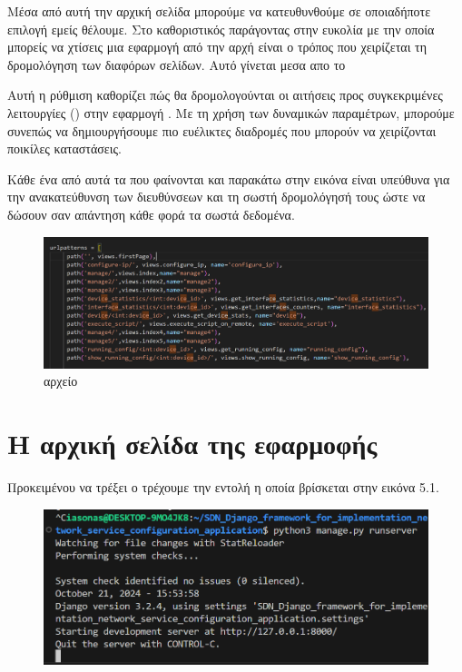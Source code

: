 Μέσα από αυτή την αρχική σελίδα μπορούμε να κατευθυνθούμε σε οποιαδήποτε επιλογή εμείς θέλουμε.
Στο  καθοριστικός παράγοντας στην ευκολία με την οποία
μπορείς να χτίσεις μια εφαρμογή από την αρχή είναι ο τρόπος που χειρίζεται
τη δρομολόγηση των διαφόρων σελίδων. Αυτό γίνεται μεσα απο το 

Αυτή η ρύθμιση καθορίζει πώς θα δρομολογούνται οι 
αιτήσεις  προς συγκεκριμένες λειτουργίες () 
στην εφαρμογή . Με τη χρήση των δυναμικών παραμέτρων, 
μπορούμε συνεπώς να δημιουργήσουμε πιο ευέλικτες διαδρομές  
που μπορούν να χειρίζονται ποικίλες καταστάσεις. 

Κάθε ένα από αυτά τα  που φαίνονται και παρακάτω στην εικόνα
είναι υπεύθυνα για την ανακατεύθυνση των διευθύνσεων και τη σωστή δρομολόγησή
τους ώστε να δώσουν σαν απάντηση κάθε φορά τα σωστά δεδομένα.


\begin{figure}[h]
	\centering
	\includegraphics[width=1.0\textwidth]{graphics/urls.png}
	\caption{  αρχείο}
\end{figure}

\FloatBarrier



\section{Η αρχική σελίδα της εφαρμοφής}

Προκειμένου να τρέξει ο 
τρέχουμε την εντολή η οποία βρίσκεται στην 
εικόνα 5.1.

\begin{figure}[h]
	\centering
	\includegraphics[width=1.0\textwidth]{graphics/django_server_run.png}
	\caption{ }
\end{figure}






